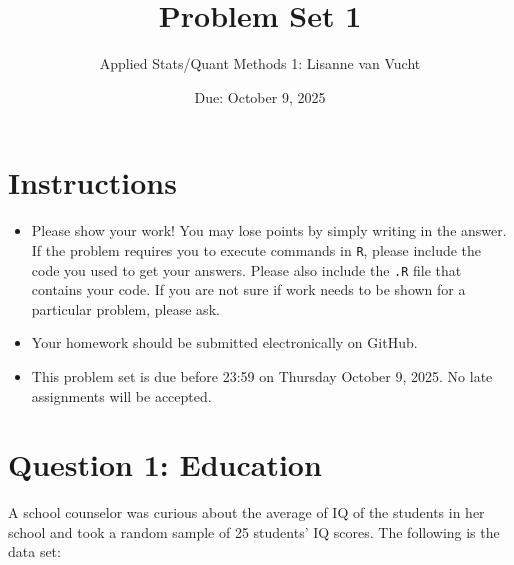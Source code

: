 \documentclass[12pt,letterpaper]{article}
\title{Problem Set 1}
\date{Due: October 9, 2025}
\author{Applied Stats/Quant Methods 1: Lisanne van Vucht}
\begin{document}
	\maketitle
	
	\section*{Instructions}
	\begin{itemize}
	\item Please show your work! You may lose points by simply writing in the answer. If the problem requires you to execute commands in \texttt{R}, please include the code you used to get your answers. Please also include the \texttt{.R} file that contains your code. If you are not sure if work needs to be shown for a particular problem, please ask.
\item Your homework should be submitted electronically on GitHub.
\item This problem set is due before 23:59 on Thursday October 9, 2025. No late assignments will be accepted.
	\end{itemize}
	
	\vspace{1cm}
	\section*{Question 1: Education}

A school counselor was curious about the average of IQ of the students in her school and took a random sample of 25 students' IQ scores. The following is the data set:\\
\vspace{.5cm}

\vspace{1cm}
\end{document}
